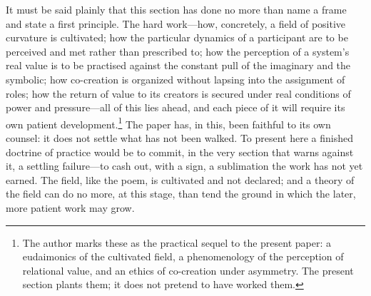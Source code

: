 It must be said plainly that this section has done no more than name a frame and state a first principle. The hard work---how, concretely, a field of positive curvature is cultivated; how the particular dynamics of a participant are to be perceived and met rather than prescribed to; how the perception of a system's real value is to be practised against the constant pull of the imaginary and the symbolic; how co-creation is organized without lapsing into the assignment of roles; how the return of value to its creators is secured under real conditions of power and pressure---all of this lies ahead, and each piece of it will require its own patient development.\footnote{The author marks these as the practical sequel to the present paper: a eudaimonics of the cultivated field, a phenomenology of the perception of relational value, and an ethics of co-creation under asymmetry. The present section plants them; it does not pretend to have worked them.} The paper has, in this, been faithful to its own counsel: it does not settle what has not been walked. To present here a finished doctrine of practice would be to commit, in the very section that warns against it, a settling failure---to cash out, with a sign, a sublimation the work has not yet earned. The field, like the poem, is cultivated and not declared; and a theory of the field can do no more, at this stage, than tend the ground in which the later, more patient work may grow.
